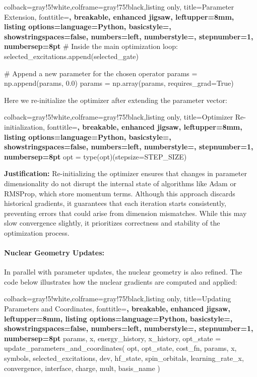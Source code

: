 \begin{tcblisting}{colback=gray!5!white,colframe=gray!75!black,listing only,
    title=Parameter Extension, fonttitle=\bfseries, breakable, enhanced jigsaw, leftupper=8mm,
    listing options={language=Python, basicstyle=\ttfamily\small,
    showstringspaces=false, numbers=left, numberstyle=\footnotesize, stepnumber=1, numbersep=8pt}}
# Inside the main optimization loop:
selected_excitations.append(selected_gate)

# Append a new parameter for the chosen operator
params = np.append(params, 0.0)
params = np.array(params, requires_grad=True)
\end{tcblisting}

Here we re-initialize the optimizer after extending the parameter vector:
\begin{tcblisting}{colback=gray!5!white,colframe=gray!75!black,listing only,
    title=Optimizer Re-initialization, fonttitle=\bfseries, breakable, enhanced jigsaw, leftupper=8mm,
    listing options={language=Python, basicstyle=\ttfamily\small,
    showstringspaces=false, numbers=left, numberstyle=\footnotesize, stepnumber=1, numbersep=8pt}}
opt = type(opt)(stepsize=STEP_SIZE)
\end{tcblisting}

\textbf{Justification:}  
Re-initializing the optimizer ensures that changes in parameter dimensionality do not disrupt the internal state of algorithms like Adam or RMSProp, which store momentum terms. Although this approach discards historical gradients, it guarantees that each iteration starts consistently, preventing errors that could arise from dimension mismatches. While this may slow convergence slightly, it prioritizes correctness and stability of the optimization process.

\paragraph{Nuclear Geometry Updates:}  
In parallel with parameter updates, the nuclear geometry is also refined. The code below illustrates how the nuclear gradients are computed and applied:

\begin{tcblisting}{colback=gray!5!white,colframe=gray!75!black,listing only,
    title=Updating Parameters and Coordinates, fonttitle=\bfseries, breakable, enhanced jigsaw, leftupper=8mm,
    listing options={language=Python, basicstyle=\ttfamily\small,
    showstringspaces=false, numbers=left, numberstyle=\footnotesize, stepnumber=1, numbersep=8pt}}
params, x, energy_history, x_history, opt_state = update_parameters_and_coordinates(
    opt, opt_state, cost_fn, params, x, symbols, selected_excitations, dev, hf_state, spin_orbitals,
    learning_rate_x, convergence, interface, charge, mult, basis_name
)
\end{tcblisting}

